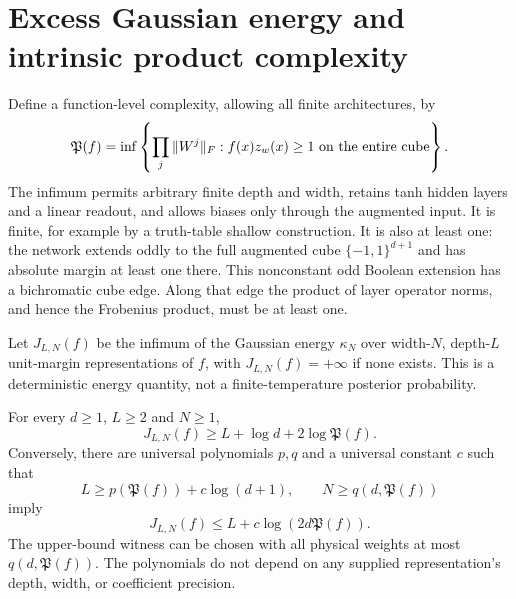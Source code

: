 \section{Excess Gaussian energy and intrinsic product complexity}
\label{sec:intrinsic-product-energy}

Define a function-level complexity, allowing all finite architectures,
by
\[
 \mathfrak P(f)=\inf\left\{
   \prod_j\|W^j\|_F:
   f(x)z_w(x)\ge1\ \hbox{on the entire cube}
   \right\}.
\]
The infimum permits arbitrary finite depth and width, retains tanh
hidden layers and a linear readout, and allows biases only through
the augmented input. It is finite, for example by a truth-table
shallow construction. It is also at least one: the network extends
oddly to the full augmented cube $\{-1,1\}^{d+1}$ and has absolute
margin at least one there. This nonconstant odd Boolean extension
has a bichromatic cube edge. Along that edge the product of layer
operator norms, and hence the Frobenius product, must be at least one.

Let $J_{L,N}(f)$ be the infimum of the Gaussian energy $\kappa_N$
over width-$N$, depth-$L$ unit-margin representations of $f$, with
$J_{L,N}(f)=+\infty$ if none exists. This is a deterministic energy
quantity, not a finite-temperature posterior probability.

\begin{theorem}
\label{thm:intrinsic-product-energy}
For every $d\ge1$, $L\ge2$ and $N\ge1$,
\[
 J_{L,N}(f)\ge L+\log d+2\log\mathfrak P(f).
\]
Conversely, there are universal polynomials $p,q$ and a universal
constant $c$ such that
\[
 L\ge p(\mathfrak P(f))+c\log(d+1),\qquad
 N\ge q(d,\mathfrak P(f))
\]
imply
\[
 J_{L,N}(f)\le L+c\log(2d\mathfrak P(f)).
\]
The upper-bound witness can be chosen with all physical weights at
most $q(d,\mathfrak P(f))$. The polynomials do not depend on any
supplied representation's depth, width, or coefficient precision.
\end{theorem}

